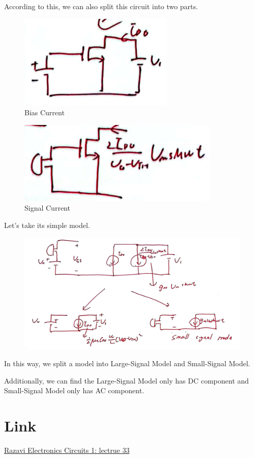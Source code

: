 \documentclass[fontset=windows]{article}
\begin{document}
According to this, we can also split this circuit into two parts. 

\begin{figure}[htbp]
    \centering
    \includegraphics[scale=0.6]{7.jpg}
    \captionsetup{labelformat=empty}
    \caption{Bias Current}
    \label{7}
\end{figure}

\begin{figure}[htbp]
    \centering
    \includegraphics[scale=0.6]{8.jpg}
    \captionsetup{labelformat=empty}
    \caption{Signal Current}
    \label{8}
\end{figure}

Let's take its simple model. 

\begin{figure}[htbp]
    \centering
    \includegraphics[scale=0.6]{9.jpg}
    \captionsetup{labelformat=empty}
    \caption{}
    \label{9}
\end{figure}

In this way, we split a model into Large-Signal Model and Small-Signal Model. 

Additionally, we can find the Large-Signal Model only has DC component and Small-Signal Model only has AC component. 

\section*{Link}

\href{https://www.bilibili.com/video/BV1FD4y1R7Ah?p=33&vd_source=1d0c07486a3bd3b0adb8ac548bf6453e}{Razavi Electronics Circuits 1: lectrue 33}
\end{document}
